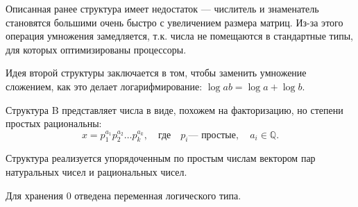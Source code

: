 \documentclass[specialist,
substylefile = spbu.rtx,
               subf,href,colorlinks=true, 12pt]{disser}
\begin{document}
    Описанная ранее структура имеет недостаток --- числитель и знаменатель становятся большими очень быстро с увеличением размера матриц. Из-за этого операция умножения замедляется, т.к. числа не помещаются в стандартные типы, для которых оптимизированы процессоры.

    Идея второй структуры заключается в том, чтобы заменить умножение сложением, как это делает логарифмирование:
    $\log a b = \log a + \log b.$

    Структура B представляет числа в виде, похожем на факторизацию, но степени простых рациональны:
    $$x= p_1^{a_1}p_2^{a_2}\dots p_k^{a_k}, \quad \text{где}\quad p_i \text{--- простые}, \quad a_i \in \mathbb{Q}.$$

    Структура реализуется упорядоченным по простым числам вектором пар натуральных чисел и рациональных чисел. 
    
    Для хранения 0 отведена переменная логического типа.

    
\end{document}
